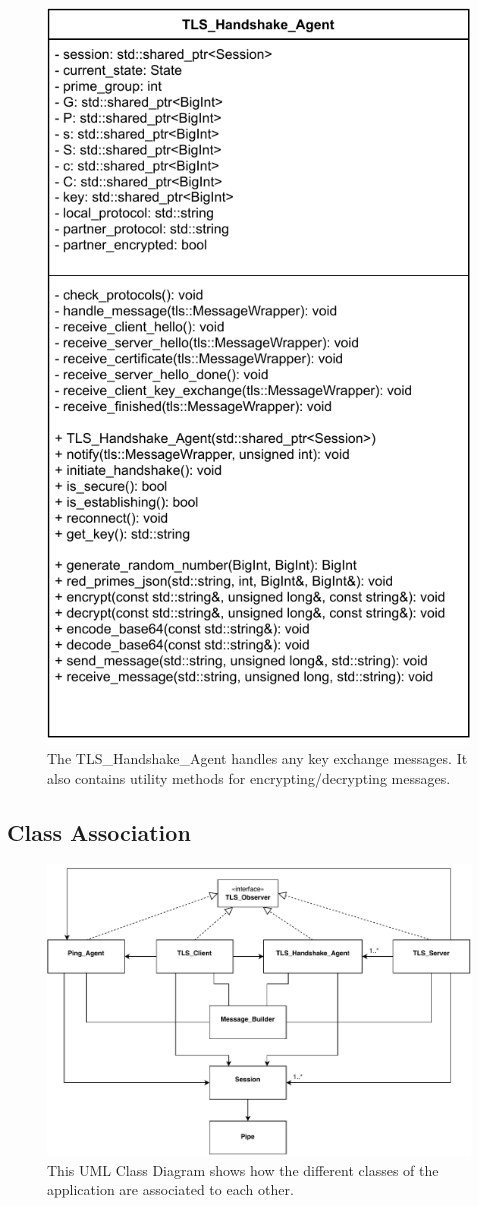 \documentclass[12pt, letterpaper]{article}
\begin{document}
\begin{figure}[H]
	\centering
	\includegraphics[width=.7\textwidth]{UML/HandshakeAgent}
	\caption{The TLS\_Handshake\_Agent handles any key exchange messages. It also contains  utility methods for encrypting/decrypting messages.}
	\label{fig:HandshakeAgent}
\end{figure}


\subsection{Class Association}

\begin{figure}[H]
	\centering
	\includegraphics[width=.9\textwidth]{UML/ClassAssociation}
	\caption{This UML Class Diagram shows how the different classes of the application are associated to each other.}
	\label{fig:ClassAssociation}
\end{figure}
\end{document}
